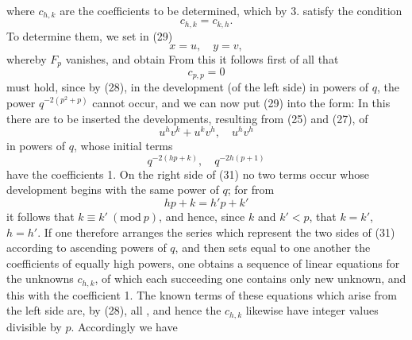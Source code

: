 where $c_{h,k}$ are the coefficients to be determined, which by 3. satisfy the condition
\[
c_{h,k} = c_{k,h}\text{.}
\]
To determine them, we set in (29)
\[
x = u, \quad y = v,
\]
whereby $F_p$ vanishes, and obtain
From this it follows first of all that
\[
c_{p,p} = 0
\]
must hold, since by (28), in the development (of the left side) in powers of $q$, the power $q^{-2(p^2+p)}$ cannot occur, and we can now put (29) into the form:
In this there are to be inserted the developments, resulting from (25) and (27), of
\[
u^h v^k + u^k v^h, \quad u^h v^h
\]
in powers of $q$, whose initial terms
\[
q^{-2(hp+k)}, \quad q^{-2h(p+1)}
\]
have the coefficients 1.
On the right side of (31) no two terms occur whose development begins with the same power of $q$; for from
\[
hp + k = h'p + k'
\]
it follows that $k \equiv k'\ (\mathrm{mod}\ p)$, and hence, since $k$ and $k' < p$, that $k = k'$, $h = h'$.
If one therefore arranges the series which represent the two sides of (31) according to ascending powers of $q$, and then sets equal to one another the coefficients of equally high powers, one obtains a sequence of linear equations for the unknowns $c_{h,k}$, of which each succeeding one contains only  new unknown, and this with the coefficient 1. The known terms of these equations which arise from the left side are, by (28), all , and hence the $c_{h,k}$ likewise have integer values divisible by $p$. Accordingly we have

